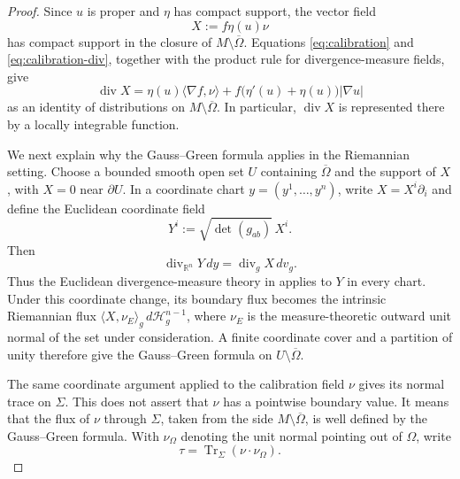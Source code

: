 \documentclass[11pt,reqno]{amsart}
\numberwithin{equation}{section}
\theoremstyle{definition}
\newcommand{\calH}{\mathcal H}
\newcommand{\diver}{\operatorname{div}}
\begin{document}
\begin{proof}
Since $u$ is proper and $\eta$ has compact support, the vector field
\begin{equation*}
    X:=f\eta(u)\nu
\end{equation*}
has compact support in the closure of $M\setminus\overline\Omega$.  Equations \eqref{eq:calibration} and \eqref{eq:calibration-div}, together with the product rule for divergence-measure fields, give
\begin{equation}
    \diver X
    =\eta(u)\langle\nabla f,\nu\rangle
     +f\bigl(\eta'(u)+\eta(u)\bigr)|\nabla u|
     \label{equ-divX}
\end{equation}
as an identity of distributions on $M\setminus\overline\Omega$.  In particular, $\diver X$ is represented there by a locally integrable function.

We next explain why the Gauss--Green formula applies in the Riemannian
setting. Choose a bounded smooth open set $U$ containing $\overline\Omega$ and the support of $X$, with $X=0$ near $\partial U$.  In a coordinate chart $y=(y^1,\ldots,y^n)$, write $X=X^i\partial_i$ and define the Euclidean coordinate field
\begin{equation*}
    Y^i:=\sqrt{\det(g_{ab})}\,X^i.
\end{equation*}
Then
\begin{equation*}
    \diver_{\mathbb R^n}Y\,dy
    =\diver_gX\,dv_g.
\end{equation*}
Thus the Euclidean divergence-measure theory in
\cite[Theorems~2.2 and~3.1]{ChenFrid1999} applies to $Y$ in every chart.  Under this coordinate change, its boundary flux becomes the intrinsic Riemannian flux $\langle X,\nu_E\rangle_g\,d\calH_g^{n-1}$, where $\nu_E$ is the measure-theoretic outward unit normal of the set under consideration.  A finite coordinate cover and a partition of unity therefore give the Gauss--Green formula on $U\setminus\overline\Omega$.

The same coordinate argument applied to the calibration field $\nu$ gives its normal trace on $\Sigma$.  This does not assert that $\nu$ has a pointwise boundary value. It means that the flux of $\nu$ through $\Sigma$, taken from the side $M\setminus\overline\Omega$, is well defined by the Gauss--Green formula.  With $\nu_{\Omega}$ denoting the unit normal pointing out of $\Omega$, write
\begin{equation*}
    \tau=\operatorname{Tr}_\Sigma(\nu\cdot\nu_\Omega).
\end{equation*}


\end{proof}
\end{document}
